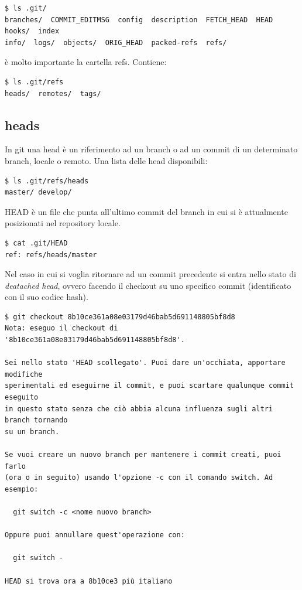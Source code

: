 \documentclass{article} \usepackage[textwidth=18cm,textheight=18cm]{geometry}
\begin{document}
\begin{verbatim}
$ ls .git/
branches/  COMMIT_EDITMSG  config  description  FETCH_HEAD  HEAD  hooks/  index  
info/  logs/  objects/  ORIG_HEAD  packed-refs  refs/
\end{verbatim}

è molto importante la cartella refs. Contiene:

\begin{verbatim}
$ ls .git/refs
heads/  remotes/  tags/
\end{verbatim}

\subsection{heads}

In git una head è un riferimento ad un branch o ad un commit di un determinato
branch, locale o remoto. Una lista delle head disponibili:

\begin{verbatim}
$ ls .git/refs/heads
master/ develop/
\end{verbatim}

HEAD è un file che punta all'ultimo commit del branch in cui si è attualmente
posizionati nel repository locale.

\begin{verbatim}
$ cat .git/HEAD
ref: refs/heads/master
\end{verbatim}

Nel caso in cui si voglia ritornare ad un commit precedente si entra nello stato
di \emph{deatached head}, ovvero facendo il checkout su uno specifico commit
(identificato con il suo codice hash).

\begin{verbatim}
$ git checkout 8b10ce361a08e03179d46bab5d691148805bf8d8
Nota: eseguo il checkout di '8b10ce361a08e03179d46bab5d691148805bf8d8'.

Sei nello stato 'HEAD scollegato'. Puoi dare un'occhiata, apportare modifiche
sperimentali ed eseguirne il commit, e puoi scartare qualunque commit eseguito
in questo stato senza che ciò abbia alcuna influenza sugli altri branch tornando
su un branch.

Se vuoi creare un nuovo branch per mantenere i commit creati, puoi farlo
(ora o in seguito) usando l'opzione -c con il comando switch. Ad esempio:

  git switch -c <nome nuovo branch>

Oppure puoi annullare quest'operazione con:

  git switch -

HEAD si trova ora a 8b10ce3 più italiano
\end{verbatim}
\end{document}
